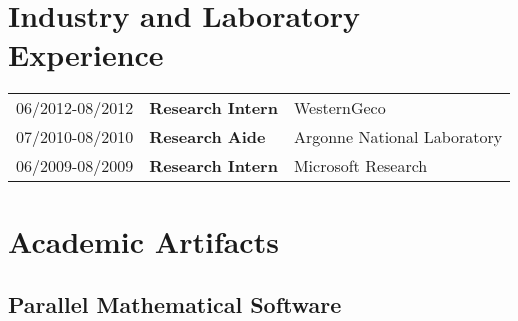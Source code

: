 \documentclass[letterpaper]{article}
\begin{document}
\section*{Industry and Laboratory Experience}

\begin{tabular}{lll}
06/2012-08/2012 & {\bf Research Intern} & WesternGeco                 \\
07/2010-08/2010 & {\bf Research Aide}   & Argonne National Laboratory \\
06/2009-08/2009 & {\bf Research Intern} & Microsoft Research          \\
\end{tabular}

\section*{Academic Artifacts}

\subsection*{Parallel Mathematical Software}
\end{document}
